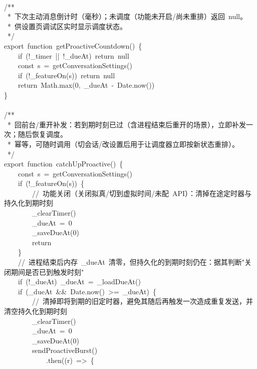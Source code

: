 \documentclass[a4paper,10pt]{article}
\begin{document}
{\ttfamily\footnotesize\raggedright
\mbox{}\\
/**\\
~*~下次主动消息倒计时（毫秒）；未调度（功能未开启/尚未重排）返回~null。\\
~*~供设置页调试区实时显示调度状态。\\
~*/\\
export~function~getProactiveCountdown()~\{\\
~~~~if~(!\_timer~||~!\_dueAt)~return~null\\
~~~~const~s~=~getConversationSettings()\\
~~~~if~(!\_featureOn(s))~return~null\\
~~~~return~Math.max(0,~\_dueAt~-~Date.now())\\
\}\\
\mbox{}\\
/**\\
~*~回前台/重开补发：若到期时刻已过（含进程结束后重开的场景），立即补发一次；随后恢复调度。\\
~*~幂等，可随时调用（切会话/改设置后用于让调度器立即按新状态重排）。\\
~*/\\
export~function~catchUpProactive()~\{\\
~~~~const~s~=~getConversationSettings()\\
~~~~if~(!\_featureOn(s))~\{\\
~~~~~~~~//~功能关闭（关闭拟真/切到虚拟时间/未配~API）：清掉在途定时器与持久化到期时刻\\
~~~~~~~~\_clearTimer()\\
~~~~~~~~\_dueAt~=~0\\
~~~~~~~~\_saveDueAt(0)\\
~~~~~~~~return\\
~~~~\}\\
~~~~//~进程结束后内存~\_dueAt~清零，但持久化的到期时刻仍在：据其判断"关闭期间是否已到触发时刻"\\
~~~~if~(!\_dueAt)~\_dueAt~=~\_loadDueAt()\\
~~~~if~(\_dueAt~\&\&~Date.now()~>=~\_dueAt)~\{\\
~~~~~~~~//~清掉即将到期的旧定时器，避免其随后再触发一次造成重复发送，并清空持久化到期时刻\\
~~~~~~~~\_clearTimer()\\
~~~~~~~~\_dueAt~=~0\\
~~~~~~~~\_saveDueAt(0)\\
~~~~~~~~sendProactiveBurst()\\
~~~~~~~~~~~~.then((r)~=>~\{\\
}
\end{document}

